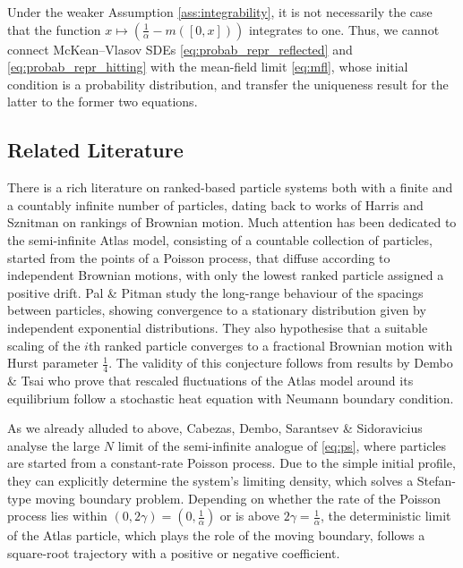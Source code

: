 \documentclass[11pt, a4paper]{article}
\theoremstyle{plain}
\theoremstyle{definition}
\theoremstyle{remark}
\numberwithin{equation}{section}
\begin{document}
Under the weaker Assumption \ref{ass:integrability}, it is not necessarily the case that the function $x \mapsto (\frac{1}{\alpha} - m([0, x]))$ integrates to one. Thus, we cannot connect McKean--Vlasov SDEs \eqref{eq:probab_repr_reflected} and \eqref{eq:probab_repr_hitting} with the mean-field limit \eqref{eq:mfl}, whose initial condition is a probability distribution, and transfer the uniqueness result for the latter to the former two equations.


\subsection{Related Literature} \label{sec:literature}

There is a rich literature on ranked-based particle systems both with a finite and a countably infinite number of particles, dating back to works of Harris \cite{harris_collisions_1965} and Sznitman \cite{sznitman_poc_1991} on rankings of Brownian motion. Much attention has been dedicated to the semi-infinite Atlas model, consisting of a countable collection of particles, started from the points of a Poisson process, that diffuse according to independent Brownian motions, with only the lowest ranked particle assigned a positive drift. Pal \& Pitman \cite{pal_ranked_bm_2008} study the long-range behaviour of the spacings between particles, showing convergence to a stationary distribution given by independent exponential distributions. They also hypothesise that a suitable scaling of the $i$th ranked particle converges to a fractional Brownian motion with Hurst parameter $\frac{1}{4}$. The validity of this conjecture follows from results by Dembo \& Tsai \cite{dembo_atlas_2017} who prove that rescaled fluctuations of the Atlas model around its equilibrium follow a stochastic heat equation with Neumann boundary condition.  

As we already alluded to above, Cabezas, Dembo, Sarantsev \& Sidoravicius \cite{cabezas_rank_2019} analyse the large $N$ limit of the semi-infinite analogue of \eqref{eq:ps}, where particles are started from a constant-rate Poisson process. Due to the simple initial profile, they can explicitly determine the system's limiting density, which solves a Stefan-type moving boundary problem. Depending on whether the rate of the Poisson process lies within $(0, 2\gamma) = (0, \frac{1}{\alpha})$ or is above $2\gamma = \frac{1}{\alpha}$, the deterministic limit of the Atlas particle, which plays the role of the moving boundary, follows a square-root trajectory with a positive or negative coefficient. 
\end{document}
